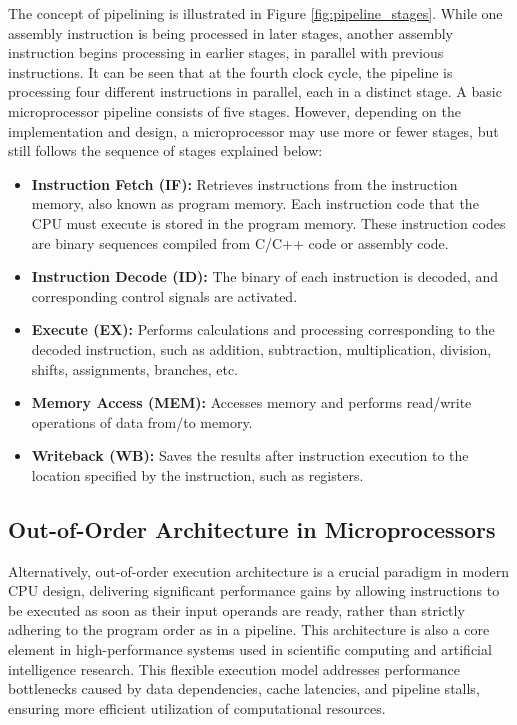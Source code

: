 The concept of pipelining is illustrated in Figure \ref{fig:pipeline_stages}. While one assembly instruction is being processed in later stages, another assembly instruction begins processing in earlier stages, in parallel with previous instructions. It can be seen that at the fourth clock cycle, the pipeline is processing four different instructions in parallel, each in a distinct stage. A basic microprocessor pipeline consists of five stages. However, depending on the implementation and design, a microprocessor may use more or fewer stages, but still follows the sequence of stages explained below:
\begin{itemize}
    \item \textbf{Instruction Fetch (IF):} Retrieves instructions from the instruction memory, also known as program memory. Each instruction code that the CPU must execute is stored in the program memory. These instruction codes are binary sequences compiled from C/C++ code or assembly code.
    \item \textbf{Instruction Decode (ID):} The binary of each instruction is decoded, and corresponding control signals are activated.
    \item \textbf{Execute (EX):} Performs calculations and processing corresponding to the decoded instruction, such as addition, subtraction, multiplication, division, shifts, assignments, branches, etc.
    \item \textbf{Memory Access (MEM):} Accesses memory and performs read/write operations of data from/to memory.
    \item \textbf{Writeback (WB):} Saves the results after instruction execution to the location specified by the instruction, such as registers.
\end{itemize}

\subsection{Out-of-Order Architecture in Microprocessors}

Alternatively, out-of-order execution architecture is a crucial paradigm in modern CPU design, delivering significant performance gains by allowing instructions to be executed as soon as their input operands are ready, rather than strictly adhering to the program order as in a pipeline. This architecture is also a core element in high-performance systems used in scientific computing and artificial intelligence research. This flexible execution model addresses performance bottlenecks caused by data dependencies, cache latencies, and pipeline stalls, ensuring more efficient utilization of computational resources.

